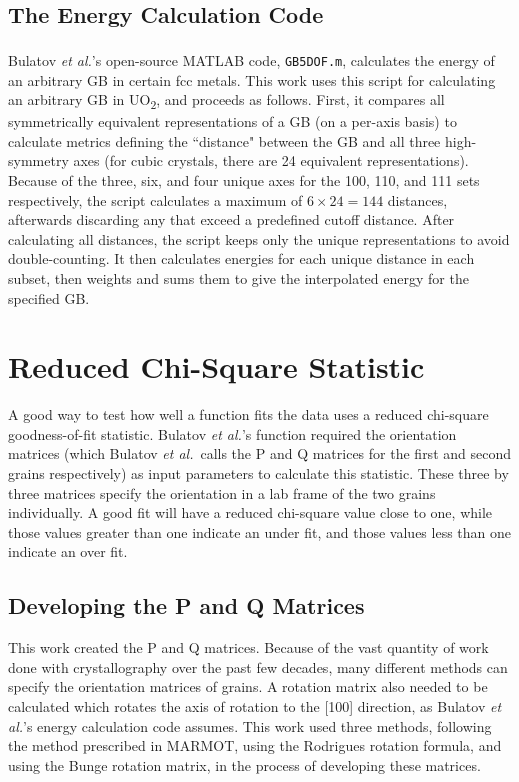 \documentclass[twoside,senior]{BYUPhys}
\begin{document}
\subsection{The Energy Calculation Code\label{code:energyCalc}}
Bulatov \emph{et al.}'s open-source MATLAB\textsuperscript{\textregistered} code\cite{bulatov2014}, \lstinline!GB5DOF.m!, calculates the energy of an arbitrary GB in certain fcc metals. This work uses this script for calculating an arbitrary GB in UO\textsubscript{2}, and proceeds as follows.  First, it compares all symmetrically equivalent representations of a GB (on a per-axis basis) to calculate metrics defining the ``distance" between the GB and all three high-symmetry axes (for cubic crystals, there are 24 equivalent representations\cite{stokes2007}).  Because of the three, six, and four unique axes for the \textlangle{}100\textrangle{}, \textlangle{}110\textrangle{}, and \textlangle{}111\textrangle{} sets respectively, the script calculates a maximum of $6\times24=144$ distances, afterwards discarding any that exceed a predefined cutoff distance.  After calculating all distances, the script keeps only the unique representations to avoid double-counting.\cite{bulatov2014}  It then calculates energies for each unique distance in each subset, then weights and sums them to give the interpolated energy for the specified GB.

\section{Reduced Chi-Square Statistic\label{methods:chi2}}
A good way to test how well a function fits the data uses a reduced chi-square goodness-of-fit statistic.\cite{bevington2003}  Bulatov \emph{et al.}'s function required the orientation matrices (which Bulatov \emph{et al.}\ calls the P and Q matrices for the first and second grains respectively) as input parameters to calculate this statistic.  These three by three matrices specify the orientation in a lab frame of the two grains individually. A good fit will have a reduced chi-square value close to one, while those values greater than one indicate an under fit, and those values less than one indicate an over fit.\cite{bevington2003}

\subsection{Developing the P and Q Matrices\label{chi2:PQ}}
This work created the P and Q matrices.  Because of the vast quantity of work done with crystallography over the past few decades, many different methods can specify the orientation matrices of grains. A rotation matrix also needed to be calculated which rotates the axis of rotation to the [100] direction, as Bulatov \emph{et al.}'s energy calculation code assumes.  This work used three methods, following the method prescribed in MARMOT, using the Rodrigues rotation formula, and using the Bunge rotation matrix, in the process of developing these matrices.
\end{document}
